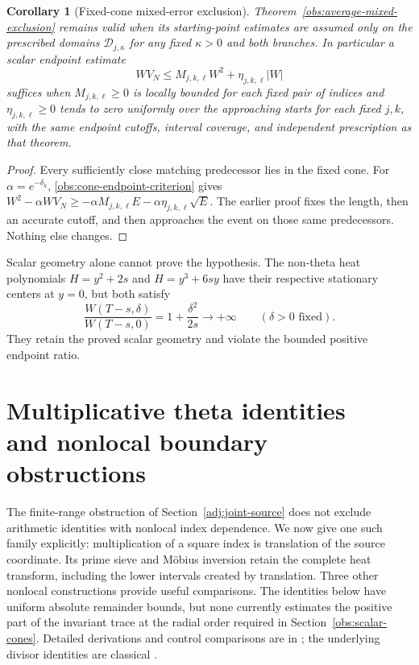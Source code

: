 \documentclass[11pt]{article}
\numberwithin{equation}{section}
\newtheorem{corollary}[theorem]{Corollary}
\theoremstyle{definition}
\theoremstyle{remark}
\begin{document}
\begin{corollary}[Fixed-cone mixed-error exclusion]
\label{obs:cone-mixed-exclusion}
Theorem~\ref{obs:average-mixed-exclusion} remains valid when its
starting-point estimates are assumed only on the prescribed domains
$\mathcal D_{j,\kappa}$ for any fixed $\kappa>0$ and both branches.
In particular a scalar endpoint estimate
\begin{equation}
 WV_N\le M_{j,k,\ell}W^2+\eta_{j,k,\ell}|W|
 \label{obs:cone-endpoint-criterion}
\end{equation}
suffices when $M_{j,k,\ell}\ge0$ is locally bounded for each fixed
pair of indices and $\eta_{j,k,\ell}\ge0$ tends to zero uniformly over the
approaching starts for each fixed $j,k$, with the same endpoint
cutoffs, interval coverage, and independent prescription as that theorem.
\end{corollary}
\begin{proof}
Every sufficiently close matching predecessor lies in the fixed cone.
For $\alpha=e^{-\delta_k}$, \eqref{obs:cone-endpoint-criterion} gives
$W^2-\alpha WV_N\ge-\alpha M_{j,k,\ell}E
-\alpha\eta_{j,k,\ell}\sqrt E$.
The earlier proof fixes the length, then an accurate cutoff, and then
approaches the event on those same predecessors. Nothing else changes.
\end{proof}

Scalar geometry alone cannot prove the hypothesis. The non-theta heat
polynomials $H=y^2+2s$ and $H=y^3+6sy$ have their respective
stationary centers at $y=0$, but both satisfy
\[
 \frac{W(T-s,\delta)}{W(T-s,0)}
 =1+\frac{\delta^2}{2s}\longrightarrow+\infty
 \qquad(\delta>0\text{ fixed}).
\]
They retain the proved scalar geometry and violate the bounded
positive endpoint ratio.

\section[Multiplicative theta identities and nonlocal boundary obstructions]{Multiplicative theta identities\\and nonlocal boundary obstructions}
\label{dil:section}

The finite-range obstruction of Section~\ref{adj:joint-source} does not
exclude arithmetic identities with nonlocal index dependence. We now give
one such family explicitly: multiplication of a square index is translation
of the source coordinate. Its prime sieve and M\"obius inversion retain
the complete heat transform, including the lower intervals created by
translation. Three other nonlocal constructions provide useful comparisons.
The identities below have uniform absolute remainder bounds, but none
currently estimates the positive part of the invariant trace at the radial
order required in Section~\ref{obs:scalar-cones}. Detailed derivations and
control comparisons are in \cite{ThetaDilation,ThetaNonlocal}; the underlying
divisor identities are classical \cite[\S27.5]{DLMF}.
\end{document}
